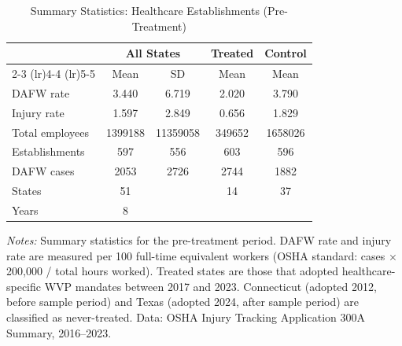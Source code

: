 \begin{table}[htbp]
\centering
\caption{Summary Statistics: Healthcare Establishments (Pre-Treatment)}
\label{tab:summary}
\begin{tabular}{lcccc}
\toprule
 & \multicolumn{2}{c}{All States} & Treated & Control \\
\cmidrule(lr){2-3} \cmidrule(lr){4-4} \cmidrule(lr){5-5}
 & Mean & SD & Mean & Mean \\
\midrule
DAFW rate & 3.440 & 6.719 & 2.020 & 3.790 \\
Injury rate & 1.597 & 2.849 & 0.656 & 1.829 \\
Total employees & 1399188 & 11359058 & 349652 & 1658026 \\
Establishments & 597 & 556 & 603 & 596 \\
DAFW cases & 2053 & 2726 & 2744 & 1882 \\
\midrule
States & 51 & & 14 & 37 \\
Years & 8 & & & \\
\bottomrule
\end{tabular}
\begin{tablenotes}[flushleft]
\small
\item \textit{Notes:} Summary statistics for the pre-treatment period. DAFW rate and injury rate are measured per 100 full-time equivalent workers (OSHA standard: cases $\times$ 200,000 / total hours worked). Treated states are those that adopted healthcare-specific WVP mandates between 2017 and 2023. Connecticut (adopted 2012, before sample period) and Texas (adopted 2024, after sample period) are classified as never-treated. Data: OSHA Injury Tracking Application 300A Summary, 2016--2023.
\end{tablenotes}
\end{table}
